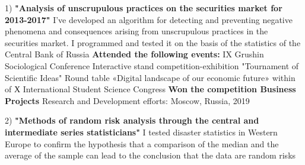 \documentclass[]{awesome-cv}
\begin{document}
\vspace{-9mm}
\begin{cventries}
	\cventry
	{1) \textbf{"Analysis of unscrupulous practices on the securities market for 2013-2017"}
	\newline \qquad \bullet  I’ve developed an algorithm for detecting and preventing negative phenomena and consequences arising from unscrupulous practices in the securities market. I programmed and tested it on the basis of the statistics of the Central Bank of Russia
	\newline 
	\textbf{Attended the following events:}
	\newline \quad IX Grushin Sociological Conference   
	\newline \quad Interactive stand competition-exhibition "Tournament of Scientific Ideas"  
	\newline \quad Round table «Digital landscape of our economic future» within of Х International Student
	\newline \quad Science Congress
	\newline \textbf{Won the competition Business Projects} } 
	{Research and Development efforts:}
	{Moscow, Russia, 2019}
	{}
	{}
		\end{cventries}  \vspace{-6mm} \begin{cventries}
	\cventry
	{2) \textbf{"Methods of random risk analysis through the central and intermediate series statisticians"}
	\newline \qquad \bullet I tested disaster statistics in Western Europe to confirm the hypothesis that a comparison of the median and the average of the sample can lead to the conclusion that the data are random risks
	}
	{}%
	{}
	{}
	{}
	\vspace{-5mm}
\end{cventries}
\end{document}
